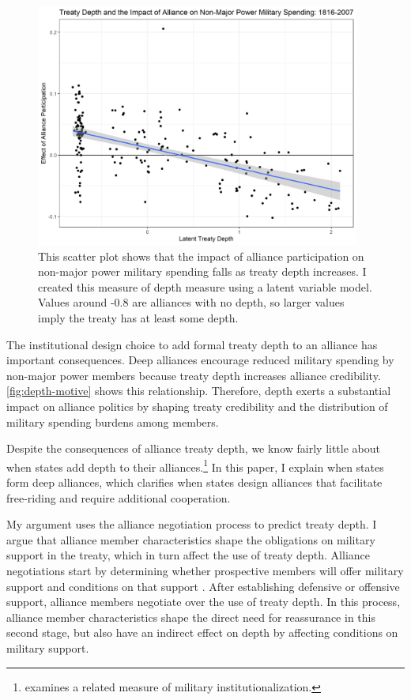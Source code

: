 \documentclass[12pt]{article}
\begin{document}
\begin{figure}[hbtp]
\centering
\includegraphics[width=0.95\textwidth]{../figures/depth-motive.png}
\caption{This scatter plot shows that the impact of alliance participation on non-major power military spending falls as treaty depth increases. I created this measure of depth measure using a latent variable model. Values around -0.8 are alliances with no depth, so larger values imply the treaty has at least some depth.}
\label{fig:depth-motive}
\end{figure}


The institutional design choice to add formal treaty depth to an alliance has important consequences. 
Deep alliances encourage reduced military spending by non-major power members because treaty depth increases alliance credibility.  
\autoref{fig:depth-motive} shows this relationship. 
Therefore, depth exerts a substantial impact on alliance politics by shaping treaty credibility and the distribution of military spending burdens among members. 


Despite the consequences of alliance treaty depth, we know fairly little about when states add depth to their alliances.\footnote{\citet{Mattes2012} examines a related measure of military institutionalization.}
In this paper, I explain when states form deep alliances, which clarifies when states design alliances that facilitate free-riding and require additional cooperation.  


My argument uses the alliance negotiation process to predict treaty depth. 
I argue that alliance member characteristics shape the obligations on military support in the treaty, which in turn affect the use of treaty depth. 
Alliance negotiations start by determining whether prospective members will offer military support and conditions on that support \citep{Poast2019a}. 
After establishing defensive or offensive support, alliance members negotiate over the use of treaty depth. 
In this process, alliance member characteristics shape the direct need for reassurance in this second stage, but also have an indirect effect on depth by affecting conditions on military support. 
\end{document}
